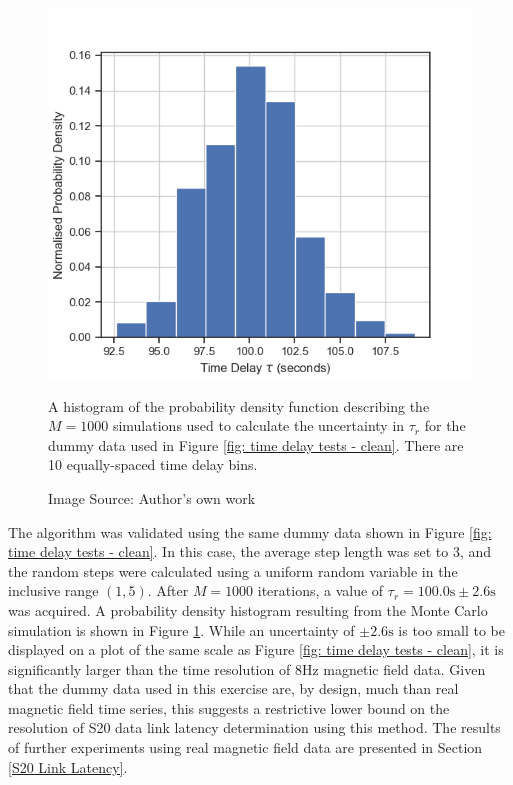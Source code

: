 \begin{figure}[h!]
    \centering
    \centerfloat
    \includegraphics[width=0.8\linewidth]{figures/dummy hist.png}
    \caption{A histogram of the probability density function describing the \(M=1000\) simulations used to calculate the uncertainty in \(\tau_r\) for the dummy data used in Figure \ref{fig: time delay tests - clean}. There are 10 equally-spaced time delay bins.}
    \caption*{Image Source: Author's own work}
    \label{fig: dummy hist}
\end{figure}

\noindent The algorithm was validated using the same dummy data shown in Figure \ref{fig: time delay tests - clean}. In this case, the average step length was set to 3, and the random steps were calculated using a uniform random variable in the inclusive range \((1,5)\). After \(M=1000\) iterations, a value of \(\tau_r=100.0\textrm{s}\pm2.6\textrm{s}\) was acquired. A probability density histogram resulting from the Monte Carlo simulation is shown in Figure \ref{fig: dummy hist}. While an uncertainty of \(\pm2.6\textrm{s}\) is too small to be displayed on a plot of the same scale as Figure \ref{fig: time delay tests - clean}, it is significantly larger than the time resolution of 8Hz magnetic field data. Given that the dummy data used in this exercise are, by design, much  than real magnetic field time series, this suggests a restrictive lower bound on the resolution of S20 data link latency determination using this method. The results of further experiments using real magnetic field data are presented in Section \ref{S20 Link Latency}.


